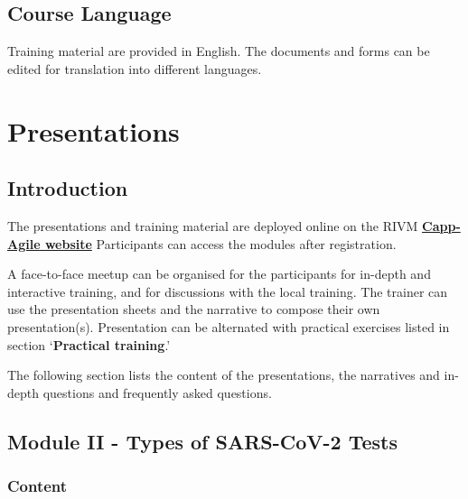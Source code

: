 \documentclass[
]{book}
\begin{document}
\hypertarget{course-language}{%
\section{Course Language}\label{course-language}}

Training material are provided in English. The documents and forms can
be edited for translation into different languages.

\hypertarget{presentations}{%
\chapter{Presentations}\label{presentations}}

\hypertarget{introduction}{%
\section{Introduction}\label{introduction}}

The presentations and training material are deployed online on the RIVM
\textbf{\href{https://rivm-training-hub.cappagile.com/login}{Capp-Agile website}}
Participants can access the modules after registration.

A face-to-face meetup can be organised for the participants for in-depth
and interactive training, and for discussions with the local training.
The trainer can use the presentation sheets and the narrative to compose
their own presentation(s). Presentation can be alternated with practical
exercises listed in section `\textbf{Practical training}.'

The following section lists the content of the presentations, the
narratives and in-depth questions and frequently asked questions.

\hypertarget{M2}{%
\section{Module II - Types of SARS-CoV-2 Tests}\label{M2}}

\hypertarget{content}{%
\subsection{Content}\label{content}}
\end{document}
